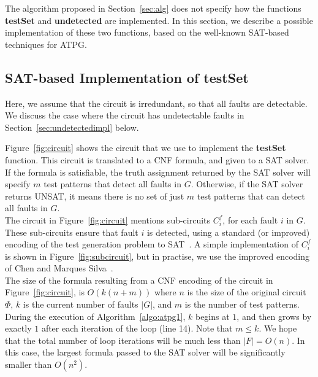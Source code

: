 \documentclass{article}
\begin{document}
The algorithm proposed in Section~\ref{sec:alg} does not specify how the functions \textbf{testSet} and \textbf{undetected} are implemented. In this section, we describe a possible implementation of these two functions, based on the well-known SAT-based techniques for ATPG.\\  

\subsection{SAT-based Implementation of \textbf{testSet}}
\label{sec:testsetimpl}

Here, we assume that the circuit is irredundant, so that all faults are detectable. We discuss the case where the circuit has undetectable faults in Section~\ref{sec:undetectedimpl} below.  

Figure~\ref{fig:circuit} shows the circuit that we use to implement the \textbf{testSet} function.  This circuit is translated to a CNF formula, and given to a SAT solver. If the formula is satisfiable, the truth assignment returned by the SAT solver will specify $m$ test patterns that detect all faults in $G$. Otherwise, if the SAT solver returns UNSAT, it means there is no set of just $m$ test patterns that can detect all faults in $G$.\\
 
The circuit in Figure~\ref{fig:circuit} mentions sub-circuits $C^f_i$, for each fault $i$ in $G$. These sub-circuits ensure that fault $i$ is detected,  using a standard (or improved) encoding of the test generation problem to SAT~\cite{Larrabee92testpattern,HuanChen_12_2013}. A simple implementation of $C^f_i$ is shown in Figure~\ref{fig:subcircuit}, but in practise, we use the improved encoding of Chen and Marques Silva~\cite{HuanChen_12_2013}.\\

The size of the formula resulting from a CNF encoding of the circuit in Figure~\ref{fig:circuit}, is $O(k(n+m))$ where $n$ is the size of the original circuit $\Phi$, $k$ is the current number of faults $|G|$, and $m$ is the number of test patterns. During the execution of Algorithm~\ref{algo:atpg1}, $k$ begins at $1$, and then grows by exactly $1$ after each iteration of the loop (line 14). Note that $m \leq k$. We hope that the total number of loop iterations will be much less than $|F| = O(n)$. In this case, the largest formula passed to the SAT solver will be significantly smaller than $O(n^2)$.  \\
\end{document}
